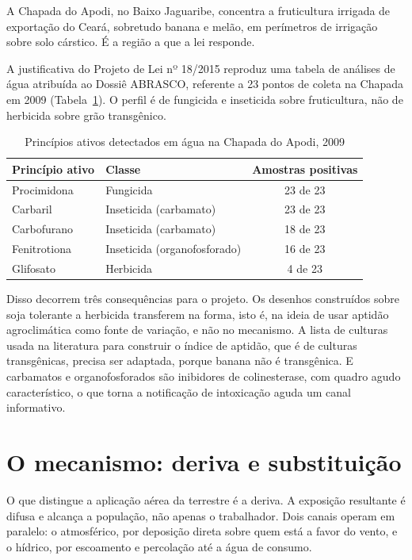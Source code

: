 A Chapada do Apodi, no Baixo Jaguaribe, concentra a fruticultura irrigada de
exportação do Ceará, sobretudo banana e melão, em perímetros de irrigação sobre
solo cárstico. É a região a que a lei responde.

A justificativa do Projeto de Lei nº 18/2015 reproduz uma tabela de análises de
água atribuída ao Dossiê ABRASCO, referente a 23 pontos de coleta na Chapada em
2009 (Tabela~\ref{tab:abrasco}). O perfil é de fungicida e inseticida sobre
fruticultura, não de herbicida sobre grão transgênico.

\begin{table}[htb]
\centering
\caption{Princípios ativos detectados em água na Chapada do Apodi, 2009}
\label{tab:abrasco}
\small
\begin{tabular}{llc}
\toprule
Princípio ativo & Classe & Amostras positivas \\
\midrule
Procimidona  & Fungicida                    & 23 de 23 \\
Carbaril     & Inseticida (carbamato)       & 23 de 23 \\
Carbofurano  & Inseticida (carbamato)       & 18 de 23 \\
Fenitrotiona & Inseticida (organofosforado) & 16 de 23 \\
Glifosato    & Herbicida                    & 4 de 23 \\
\bottomrule
\end{tabular}
\end{table}

Disso decorrem três consequências para o projeto. Os desenhos construídos sobre
soja tolerante a herbicida transferem na forma, isto é, na ideia de usar
aptidão agroclimática como fonte de variação, e não no mecanismo. A lista de
culturas usada na literatura para construir o índice de aptidão, que é de
culturas transgênicas, precisa ser adaptada, porque banana não é transgênica. E
carbamatos e organofosforados são inibidores de colinesterase, com quadro agudo
característico, o que torna a notificação de intoxicação aguda um canal
informativo.

\section{O mecanismo: deriva e substituição}
\label{sec:deriva}

O que distingue a aplicação aérea da terrestre é a deriva. A exposição
resultante é difusa e alcança a população, não apenas o trabalhador. Dois
canais operam em paralelo: o atmosférico, por deposição direta sobre quem está
a favor do vento, e o hídrico, por escoamento e percolação até a água de
consumo.

